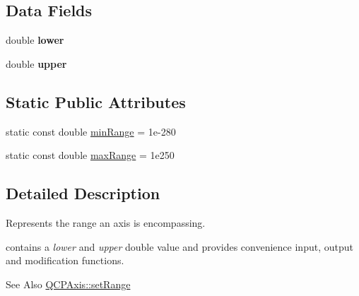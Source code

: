 \subsection*{Data Fields}
\begin{DoxyCompactItemize}
\item 
\hypertarget{classQCPRange_aa3aca3edb14f7ca0c85d912647b91745}{double {\bfseries lower}}\label{classQCPRange_aa3aca3edb14f7ca0c85d912647b91745}

\item 
\hypertarget{classQCPRange_ae44eb3aafe1d0e2ed34b499b6d2e074f}{double {\bfseries upper}}\label{classQCPRange_ae44eb3aafe1d0e2ed34b499b6d2e074f}

\end{DoxyCompactItemize}
\subsection*{Static Public Attributes}
\begin{DoxyCompactItemize}
\item 
static const double \hyperlink{classQCPRange_ab46d3bc95030ee25efda41b89e2b616b}{min\-Range} = 1e-\/280
\item 
static const double \hyperlink{classQCPRange_a5ca51e7a2dc5dc0d49527ab171fe1f4f}{max\-Range} = 1e250
\end{DoxyCompactItemize}


\subsection{Detailed Description}
Represents the range an axis is encompassing. 

contains a {\itshape lower} and {\itshape upper} double value and provides convenience input, output and modification functions.

\begin{DoxySeeAlso}{See Also}
\hyperlink{classQCPAxis_a57d6ee9e9009fe88cb19db476ec70bca}{Q\-C\-P\-Axis\-::set\-Range} 
\end{DoxySeeAlso}


